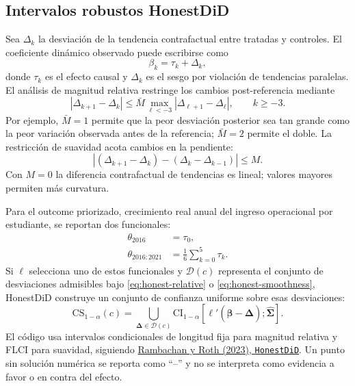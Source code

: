 \documentclass[11pt]{article}
\newcommand{\file}[1]{\texttt{#1}}
\begin{document}
\subsection{Intervalos robustos HonestDiD}

Sea $\Delta_k$ la desviación de la tendencia contrafactual entre tratadas y
controles. El coeficiente dinámico observado puede escribirse como
\begin{equation}
 \beta_k=\tau_k+\Delta_k,
 \label{eq:event-bias-decomposition}
\end{equation}
donde $\tau_k$ es el efecto causal y $\Delta_k$ es el sesgo por violación de
tendencias paralelas. El análisis de magnitud relativa restringe los cambios
post-referencia mediante
\begin{equation}
 |\Delta_{k+1}-\Delta_k|
 \leq \bar M
 \max_{\ell<-3}|\Delta_{\ell+1}-\Delta_\ell|,
 \qquad k\geq-3.
 \label{eq:honest-relative}
\end{equation}
Por ejemplo, $\bar M=1$ permite que la peor desviación posterior sea tan grande
como la peor variación observada antes de la referencia; $\bar M=2$ permite el
doble. La restricción de suavidad acota cambios en la pendiente:
\begin{equation}
 |(\Delta_{k+1}-\Delta_k)-(\Delta_k-\Delta_{k-1})|\leq M.
 \label{eq:honest-smoothness}
\end{equation}
Con $M=0$ la diferencia contrafactual de tendencias es lineal; valores mayores
permiten más curvatura.

Para el outcome priorizado, crecimiento real anual del ingreso operacional por
estudiante, se reportan dos funcionales:
\begin{align}
 \theta_{2016}&=\tau_0, \\
 \theta_{2016:2021}&=\frac{1}{6}\sum_{k=0}^{5}\tau_k.
 \label{eq:honest-estimands}
\end{align}
Si $\boldsymbol\ell$ selecciona uno de estos funcionales y
$\mathcal D(c)$ representa el conjunto de desviaciones admisibles bajo
\eqref{eq:honest-relative} o \eqref{eq:honest-smoothness}, HonestDiD construye
un conjunto de confianza uniforme sobre esas desviaciones:
\begin{equation}
 \mathrm{CS}_{1-\alpha}(c)
 =\bigcup_{\boldsymbol\Delta\in\mathcal D(c)}
 \mathrm{CI}_{1-\alpha}
 \left[\boldsymbol\ell'
 (\widehat{\boldsymbol\beta}-\boldsymbol\Delta);
 \widehat{\boldsymbol\Sigma}\right].
 \label{eq:honest-cs}
\end{equation}
El código usa intervalos condicionales de longitud fija para magnitud relativa y
FLCI para suavidad, siguiendo
\href{https://github.com/asheshrambachan/HonestDiD}{Rambachan y Roth (2023),
\file{HonestDiD}}. Un punto sin solución numérica se reporta como ``--'' y no se
interpreta como evidencia a favor o en contra del efecto.
\end{document}
